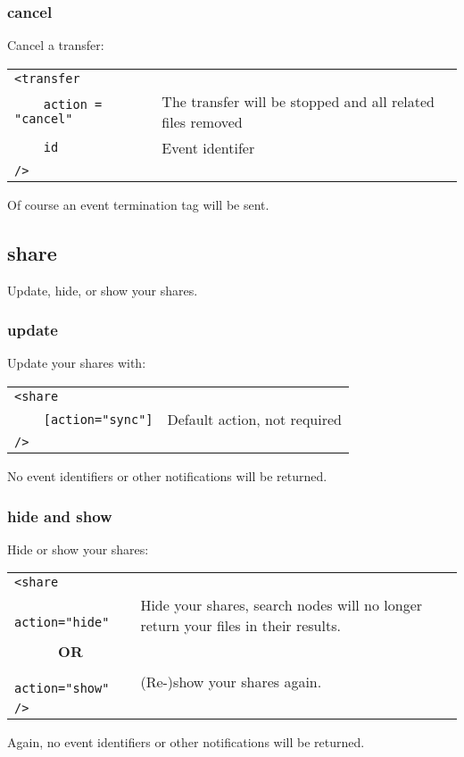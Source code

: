\documentclass[10pt]{article}
\begin{document}
\subsubsection{cancel}
Cancel a transfer:

\begin{tabular}{p{3.9cm}p{7.2cm}}
\verb|<transfer|    &  \\
\verb|    action = "cancel"| & The transfer will be stopped and all related files removed \\
\verb|    id|       & Event identifer \\
\verb|/>|           &
\end{tabular}

Of course an event termination tag will be sent.

\subsection{share}
Update, hide, or show your shares.

\subsubsection{update}
Update your shares with:

\begin{tabular}{p{3.9cm}p{7.2cm}}
\verb|<share|   & \\
\verb|    [action="sync"]|    & Default action, not required \\
\verb|/>|       &
\end{tabular}

No event identifiers or other notifications will be returned.

\subsubsection{hide and show}
Hide or show your shares:

\begin{tabular}{p{3.9cm}p{7.2cm}}
\verb|<share|   & \\
\verb|    action="hide"|    & Hide your shares, search nodes will no longer return your files in their results. \\
\verb|      |\textbf{OR}    & \\
\verb|    action="show"|    & (Re-)show your shares again. \\
\verb|/>|       &
\end{tabular}

Again, no event identifiers or other notifications will be returned.
  
\end{document}
